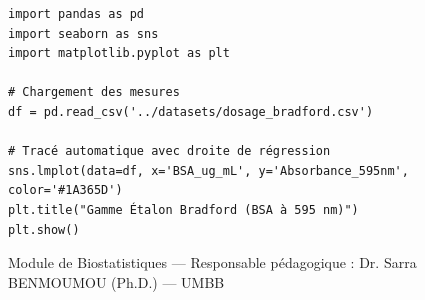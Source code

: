 \documentclass[11pt,a4paper]{article}
\begin{document}
\vspace{5mm}
\begin{tcolorbox}[colback=BioTeal!10, colframe=BioTeal, title={\faFlask\hspace{0.5em}Exemple Immédiat : Tracer une Gamme Étalon en 3 Lignes}]
\small
\begin{verbatim}
import pandas as pd
import seaborn as sns
import matplotlib.pyplot as plt

# Chargement des mesures
df = pd.read_csv('../datasets/dosage_bradford.csv')

# Tracé automatique avec droite de régression
sns.lmplot(data=df, x='BSA_ug_mL', y='Absorbance_595nm', color='#1A365D')
plt.title("Gamme Étalon Bradford (BSA à 595 nm)")
plt.show()
\end{verbatim}
\end{tcolorbox}

\vspace{5mm}
\begin{center}
  \footnotesize
  \color{gray}
  Module de Biostatistiques --- Responsable pédagogique : Dr. Sarra BENMOUMOU (Ph.D.) --- UMBB
\end{center}
\end{document}
